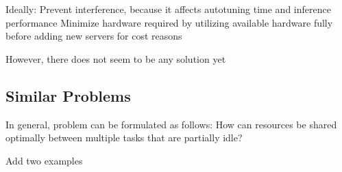Ideally:
Prevent interference, because it affects autotuning time and inference performance
Minimize hardware required by utilizing available hardware fully before adding new servers for cost reasons

However, there does not seem to be any solution yet

\subsection{Similar Problems}
In general, problem can be formulated as follows:
How can resources be shared optimally between multiple tasks that are partially idle?

Add two examples